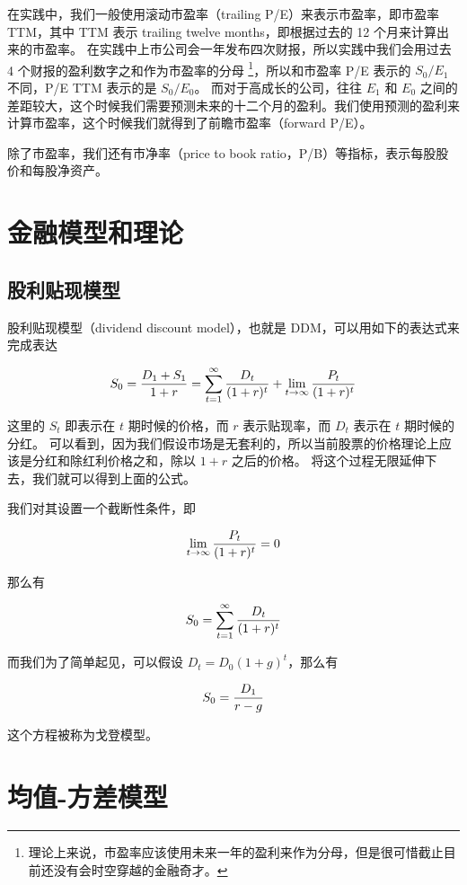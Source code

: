 \documentclass[utf8,a4paper,nofonts,9pt]{ctexbook}
\begin{document}
在实践中，我们一般使用滚动市盈率（trailing P/E）来表示市盈率，即市盈率 TTM，其中 TTM 表示 trailing twelve months，即根据过去的 12 个月来计算出来的市盈率。
在实践中上市公司会一年发布四次财报，所以实践中我们会用过去 4 个财报的盈利数字之和作为市盈率的分母
\footnote{理论上来说，市盈率应该使用未来一年的盈利来作为分母，但是很可惜截止目前还没有会时空穿越的金融奇才。}，所以和市盈率 P/E 表示的 $S_0 / E_1$ 不同，P/E TTM 表示的是 $S_0 / E_0$。
而对于高成长的公司，往往 $E_1$ 和 $E_0$ 之间的差距较大，这个时候我们需要预测未来的十二个月的盈利。我们使用预测的盈利来计算市盈率，这个时候我们就得到了前瞻市盈率（forward P/E）。

除了市盈率，我们还有市净率（price to book ratio，P/B）等指标，表示每股股价和每股净资产。

\section{金融模型和理论}

\subsection{股利贴现模型}
\label{title:DDM}

股利贴现模型（dividend discount model），也就是 DDM，可以用如下的表达式来完成表达

$$
S_0 = {D_1 + S_1 \over 1 + r} = \sum_{t=1}^{\infty} {D_t \over (1 + r)^t} + \lim_{t \to \infty} {P_t \over (1 + r)^t}
$$

这里的 $S_t$ 即表示在 $t$ 期时候的价格，而 $r$ 表示贴现率，而 $D_t$ 表示在 $t$ 期时候的分红。
可以看到，因为我们假设市场是无套利的，所以当前股票的价格理论上应该是分红和除红利价格之和，除以 $1 + r$ 之后的价格。
将这个过程无限延伸下去，我们就可以得到上面的公式。

我们对其设置一个截断性条件，即

$$
\lim_{t \to \infty} {P_t \over (1 + r)^t} = 0
$$

那么有

$$
S_0 = \sum_{t=1}^{\infty} {D_t \over (1 + r)^t}
$$

而我们为了简单起见，可以假设 $D_t = D_0 (1 + g)^t$，那么有

$$
S_0 = {D_1 \over r - g}
$$

这个方程被称为戈登模型。



\section{均值-方差模型}
\label{title:E-sigma-model}
\end{document}
